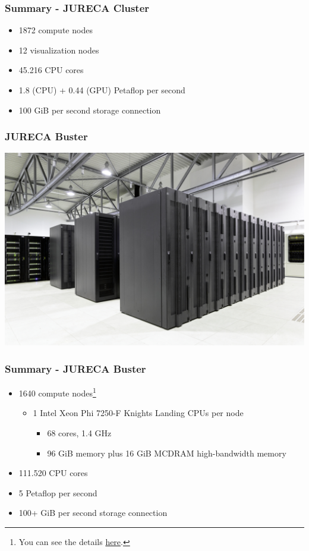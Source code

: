 \documentclass{beamer}
\begin{document}
\begin{frame}
  \frametitle{Summary - JURECA Cluster}
  \begin{itemize}
    \item 1872 compute nodes
    \item 12 visualization nodes
    \item 45.216 CPU cores
    \item 1.8 (CPU) + 0.44 (GPU) Petaflop per second
    \item 100 GiB per second storage connection
  \end{itemize}
\end{frame}

\begin{frame}
  \frametitle{JURECA Buster}
  \includegraphics[width=\textwidth]{./images/jureca-buster.jpeg}
\end{frame}

\begin{frame}
  \frametitle{Summary - JURECA Buster}
  \begin{itemize}
    \item 1640 compute nodes\footnote{You can see the details \href{https://www.fz-juelich.de/ias/jsc/EN/Expertise/Supercomputers/JURECA/Configuration/Configuration_node.html}{here}.}
          \begin{itemize}
            \item 1 Intel Xeon Phi 7250-F Knights Landing CPUs per node
                  \begin{itemize}
                    \item 68 cores, 1.4 GHz
                    \item 96 GiB memory plus 16 GiB MCDRAM high-bandwidth memory
                  \end{itemize}
          \end{itemize}
    \item 111.520 CPU cores
    \item 5 Petaflop per second
    \item 100+ GiB per second storage connection
  \end{itemize}
\end{frame}
\end{document}
